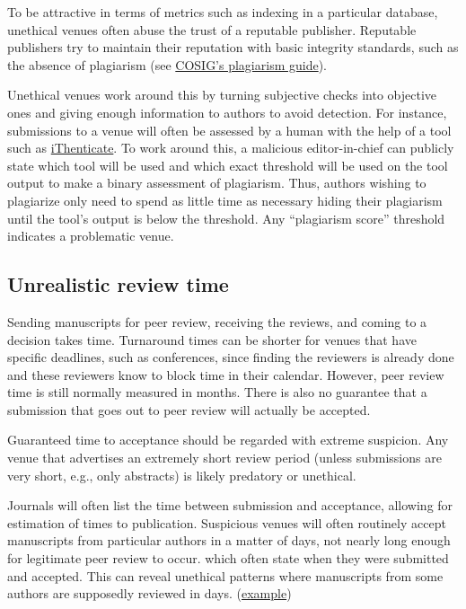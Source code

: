 \documentclass[letterpaper, 12pt]{article}
\begin{document}
To be attractive in terms of metrics such as indexing in a particular database,
unethical venues often abuse the trust of a reputable publisher.
Reputable publishers try to maintain their reputation with basic integrity standards, such as the absence of plagiarism (see \href{https://osf.io/ntcb4}{COSIG's plagiarism guide}).

Unethical venues work around this by turning subjective checks into objective ones
and giving enough information to authors to avoid detection.
For instance, submissions to a venue will often be assessed by a human with the help of a tool such as
\href{https://www.ithenticate.com/}{iThenticate}.
To work around this, a malicious editor-in-chief can publicly state which tool will be used
and which exact threshold will be used on the tool output to make a binary assessment of plagiarism.
Thus, authors wishing to plagiarize only need to spend as little time as necessary hiding their plagiarism
until the tool's output is below the threshold.
Any ``plagiarism score'' threshold indicates a problematic venue.

\subsection*{Unrealistic review time}

Sending manuscripts for peer review, receiving the reviews, and coming to a decision takes time.
Turnaround times can be shorter for venues that have specific deadlines, such as conferences,
since finding the reviewers is already done and these reviewers know to block time in their calendar.
However, peer review time is still normally measured in months. There is also no guarantee that a submission that goes out to peer review will actually be accepted.

Guaranteed time to acceptance should be regarded with extreme suspicion. Any venue that advertises an extremely short review period (unless submissions are very short, e.g., only abstracts) is likely predatory or unethical.

Journals will often list the time between submission and acceptance, allowing for estimation of times to publication. Suspicious venues will often routinely accept manuscripts from particular authors in a matter of days, not nearly long enough for legitimate peer review to occur.
which often state when they were submitted and accepted.
This can reveal unethical patterns where manuscripts from some authors are supposedly reviewed in days.
(\href{https://deevybee.blogspot.com/2015/02/editors-behaving-badly.html}{example})
\end{document}

